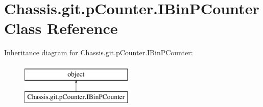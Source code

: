 \hypertarget{class_chassis_8git_1_1p_counter_1_1_i_bin_p_counter}{\section{Chassis.\-git.\-p\-Counter.\-I\-Bin\-P\-Counter Class Reference}
\label{class_chassis_8git_1_1p_counter_1_1_i_bin_p_counter}
}
Inheritance diagram for Chassis.\-git.\-p\-Counter.\-I\-Bin\-P\-Counter\-:\begin{figure}[H]
\begin{center}
\leavevmode
\includegraphics[height=2.000000cm]{class_chassis_8git_1_1p_counter_1_1_i_bin_p_counter}
\end{center}
\end{figure}
